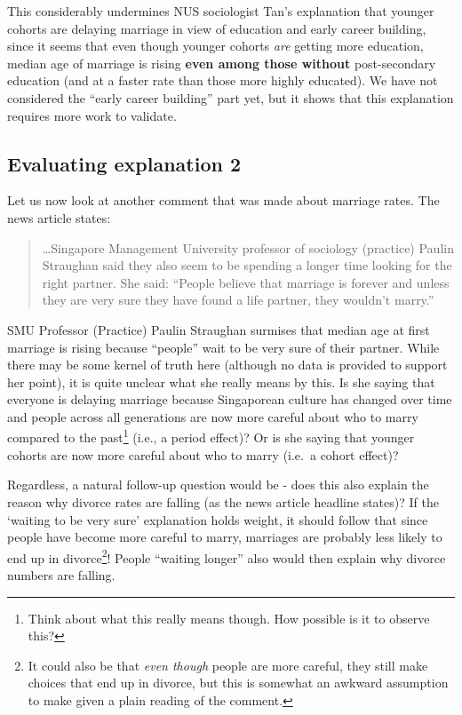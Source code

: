 \documentclass[openany]{book}
\let\rmarkdownfootnote\footnote%
\def\footnote{\protect\rmarkdownfootnote}
\begin{document}
This considerably undermines NUS sociologist Tan's explanation that
younger cohorts are delaying marriage in view of education and early
career building, since it seems that even though younger cohorts
\emph{are} getting more education, median age of marriage is rising
\textbf{even among those without} post-secondary education (and at a
faster rate than those more highly educated). We have not considered the
``early career building'' part yet, but it shows that this explanation
requires more work to validate.

\subsection{Evaluating explanation 2}\label{evaluating-explanation-2}

Let us now look at another comment that was made about marriage rates.
The news article states:

\begin{quote}
\ldots{}Singapore Management University professor of sociology
(practice) Paulin Straughan said they also seem to be spending a longer
time looking for the right partner. She said: ``People believe that
marriage is forever and unless they are very sure they have found a life
partner, they wouldn't marry.''
\end{quote}

SMU Professor (Practice) Paulin Straughan surmises that median age at
first marriage is rising because ``people'' wait to be very sure of
their partner. While there may be some kernel of truth here (although no
data is provided to support her point), it is quite unclear what she
really means by this. Is she saying that everyone is delaying marriage
because Singaporean culture has changed over time and people across all
generations are now more careful about who to marry compared to the
past\footnote{Think about what this really means though. How possible is
  it to observe this?} (i.e., a period effect)? Or is she saying that
younger cohorts are now more careful about who to marry (i.e.~a cohort
effect)?

Regardless, a natural follow-up question would be - does this also
explain the reason why divorce rates are falling (as the news article
headline states)? If the `waiting to be very sure' explanation holds
weight, it should follow that since people have become more careful to
marry, marriages are probably less likely to end up in divorce\footnote{It
  could also be that \emph{even though} people are more careful, they
  still make choices that end up in divorce, but this is somewhat an
  awkward assumption to make given a plain reading of the comment.}!
People ``waiting longer'' also would then explain why divorce numbers
are falling.
\end{document}
